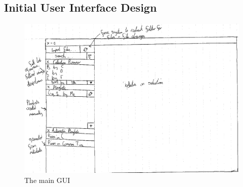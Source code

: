 \begin{appendices}
\section{Initial User Interface Design}
\begin{figure}[H]
	\centering
	\includegraphics[width=400pt]{designs/main}
	\caption{The main GUI}
	\label{fig:m}	
\end{figure}


\end{appendices}
